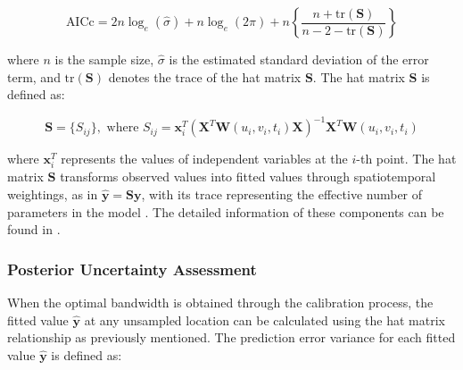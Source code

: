 \begin{equation}
	\text{AICc} = 2n \log_e (\hat{\sigma}) + n \log_e (2\pi) + n \left\{ \frac{n + \text{tr}(\mathbf{S})}{n - 2 - \text{tr}(\mathbf{S})} \right\}
\label{eq:aicc}
\end{equation}

\noindent where \(n\) is the sample size, \(\hat{\sigma}\) is the estimated standard deviation of the error term, and \(\text{tr}(\mathbf{S})\) denotes the trace of the hat matrix $\mathbf{S}$. The hat matrix $\mathbf{S}$ is defined as:

\begin{equation}
	\mathbf{S} = \{S_{ij}\}, \text{ where } S_{ij} = \mathbf{x}_i^T(\mathbf{X}^T \mathbf{W}(u_i, v_i, t_i) \mathbf{X})^{-1}\mathbf{X}^T \mathbf{W}(u_i, v_i, t_i)
	\label{eq:hat_matrix}
\end{equation}

\noindent  where $\mathbf{x}_i^T$ represents the values of independent variables at the $i$-th point. The hat matrix $\mathbf{S}$ transforms observed values into fitted values through spatiotemporal weightings, as in $\hat{\mathbf{y}} = \mathbf{S}\mathbf{y}$, with its trace representing the effective number of parameters in the model \citet{hat_matrix}. The detailed information of these components can be found in \citet{fotheringham2002geographically}.



\subsubsection{Posterior Uncertainty Assessment}
\label{subsec:gtwr_prediction}

When the optimal bandwidth is obtained through the calibration process, the fitted value $\hat{\mathbf{y}}$ at any unsampled location can be calculated using the hat matrix relationship as previously mentioned. The prediction error variance for each fitted value $\hat{\mathbf{y}}$ is defined as:


